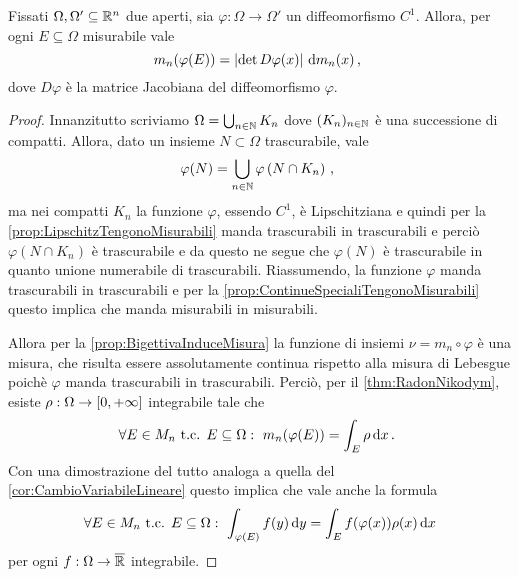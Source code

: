\begin{lemma}\label{lemma:MisuraImmagine}
	Fissati $\Omega,\Omega'\subseteq\mathbb R^n$ due aperti, sia $\varphi:\Omega\to\Omega'$ un diffeomorfismo $C^1$.
	Allora, per ogni $E\subseteq \Omega$ misurabile vale
	\begin{equation*}
		m_n(\varphi(E))=\left\lvert \det D\varphi(x) \right\rvert \,\mathrm d m_n(x)\, \text{, }
	\end{equation*}
	dove $D\varphi$ è la matrice Jacobiana del diffeomorfismo $\varphi$.
\end{lemma}
\begin{proof}
	Innanzitutto scriviamo $\Omega=\bigcup_{n\in\mathbb N} K_n$ dove $(K_n)_{n\in\mathbb N}$ è una successione di compatti. 
	Allora, dato un insieme $N\subset\Omega$ trascurabile, vale
	\begin{equation*}
		\varphi(N)=\bigcup_{n\in\mathbb N} \varphi\left(N\cap K_n\right)\, \text{, }
	\end{equation*}
	ma nei compatti $K_n$ la funzione $\varphi$, essendo $C^1$, è Lipschitziana e quindi per la \cref{prop:LipschitzTengonoMisurabili} manda trascurabili in trascurabili e perciò $\varphi\left(N\cap K_n\right)$ è trascurabile e da questo ne segue che $\varphi(N)$ è trascurabile in quanto unione numerabile di trascurabili.
	Riassumendo, la funzione $\varphi$ manda trascurabili in trascurabili e per la \cref{prop:ContinueSpecialiTengonoMisurabili} questo implica che manda misurabili in misurabili.
	
	Allora per la \cref{prop:BigettivaInduceMisura} la funzione di insiemi $\nu=m_n\circ \varphi$ è una misura, che risulta essere assolutamente continua rispetto alla misura di Lebesgue poichè $\varphi$ manda trascurabili in trascurabili.
	Perciò, per il \cref{thm:RadonNikodym}, esiste $\rho:\Omega\to[0,+\infty]$ integrabile tale che
	\begin{equation*}
		\forall E\in M_n\text{ t.c. } E\subseteq \Omega:\ m_n(\varphi(E))=\int_E \rho \,\mathrm d x \, \text{. }
	\end{equation*}
	Con una dimostrazione del tutto analoga a quella del \cref{cor:CambioVariabileLineare} questo implica che vale anche la formula
	\begin{equation}\label{eq:CambioRadonNikodym}
		\forall E\in M_n\text{ t.c. } E\subseteq\Omega:\ \int_{\varphi(E)} f(y)\de y = \int_{E} f(\varphi(x))\rho(x) \de x
	\end{equation}
	per ogni $f:\Omega\to\overline{\mathbb R}$ integrabile.
	

\end{proof}
